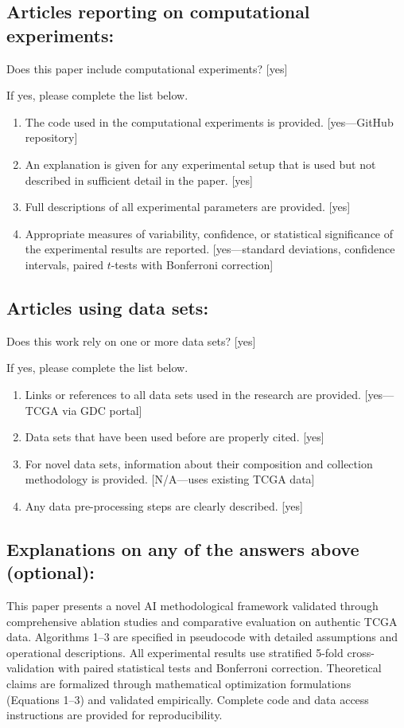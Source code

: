 \documentclass[manuscript, screen, review]{jair}
\begin{document}
\subsection*{Articles reporting on computational experiments:}

Does this paper include computational experiments? [yes]

If yes, please complete the list below.

\begin{enumerate}
  \item The code used in the computational experiments is provided. [yes---GitHub repository]
  \item An explanation is given for any experimental setup that is used but not described in sufficient detail in the paper. [yes]
  \item Full descriptions of all experimental parameters are provided. [yes]
  \item Appropriate measures of variability, confidence, or statistical significance of the experimental results are reported. [yes---standard deviations, confidence intervals, paired $t$-tests with Bonferroni correction]
\end{enumerate}

\subsection*{Articles using data sets:}

Does this work rely on one or more data sets? [yes]

If yes, please complete the list below.

\begin{enumerate}
  \item Links or references to all data sets used in the research are provided. [yes---TCGA via GDC portal]
  \item Data sets that have been used before are properly cited. [yes]
  \item For novel data sets, information about their composition and collection methodology is provided. [N/A---uses existing TCGA data]
  \item Any data pre-processing steps are clearly described. [yes]
\end{enumerate}

\subsection*{Explanations on any of the answers above (optional):}

This paper presents a novel AI methodological framework validated through comprehensive ablation studies and comparative evaluation on authentic TCGA data. Algorithms 1--3 are specified in pseudocode with detailed assumptions and operational descriptions. All experimental results use stratified 5-fold cross-validation with paired statistical tests and Bonferroni correction. Theoretical claims are formalized through mathematical optimization formulations (Equations 1--3) and validated empirically. Complete code and data access instructions are provided for reproducibility.

\end{document}

